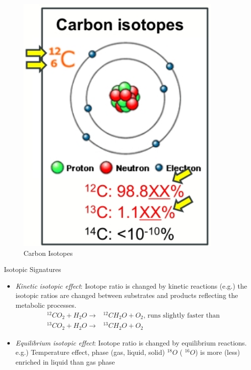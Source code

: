 \documentclass[]{article}
\begin{document}
\begin{figure}[H]
	\caption{Carbon Isotopes}\label{fig:CarbonIsotopes}
	\includegraphics[width=0.9\textwidth]{CarbonIsotopes}
\end{figure}

Isotopic Signatures

\begin{itemize}
	\item \textit{Kinetic isotopic effect}:
	Isotope ratio is changed by kinetic reactions 	(e.g.) the isotopic ratios are changed between substrates and products reflecting the metabolic processes. \begin{align*}
	^{12}CO_2 + H_2O \rightarrow&^{12}CH_2O + O_2 \text{, runs slightly faster than}\\
	^{13}CO_2 + H_2O \rightarrow&^{13}CH_2O + O_2 
	\end{align*}
	\item \textit{Equilibrium isotopic effect}:
	Isotope ratio is changed by equilibrium reactions.
	e.g.) Temperature effect, phase (gas, liquid, solid)
	$^{18}O$ ( $^{16}O$) is more (less) enriched in liquid than gas phase
\end{itemize}
\end{document}
